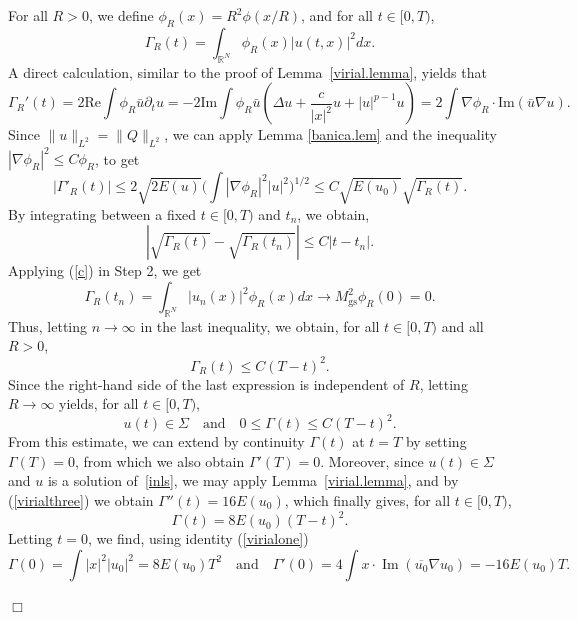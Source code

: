 \documentclass[reqno]{amsart}
\newcommand{\real}{\mathbb{R}}
\newcommand{\rn}{\real^N}
\let\le=\leqslant
\DeclareMathOperator \im{Im}
\theoremstyle{plain}
\theoremstyle{definition}
\numberwithin{equation}{section}
\newenvironment{proofof}
{\medskip\noindent{\it Proof of}}{\nolinebreak\hfill$\Box$\medskip}
\begin{document}
\begin{proofof}
For all $R>0$, we define $\phi_R(x)=R^2\phi(x/R)$, and for all $t\in[0,T)$,
\[
\Gamma_R(t)=\int_{\rn}\phi_R(x)|u(t,x)|^2dx.
\]
A direct calculation, similar to the proof of Lemma~\ref{virial.lemma}, yields that
\[
\Gamma_R'(t)=2\text{Re}\int\phi_R\bar{u}\partial_tu 
=-2\text{Im}\int\phi_R\bar{u}(\Delta u+\frac{c}{|x|^2}u+|u|^{p-1}u)
=2\int\nabla\phi_R\cdot\text{Im}(\bar{u}\nabla u).
\]
Since $\|u\|_{L^2}=\|Q\|_{L^2}$, we can apply Lemma \ref{banica.lem} 
and the inequality $|\nabla\phi_R|^2\le C\phi_R$, to get 
\[
|\Gamma'_R(t)|\le 2\sqrt{2E(u)}\Big(\int|\nabla\phi_R|^2|u|^2\Big)^{1/2}
\le C\sqrt{E(u_0)}\sqrt{\Gamma_R(t)}.
\]
By integrating between a fixed $t\in[0,T)$ and $t_n$, we obtain,
\[
|\sqrt{\Gamma_R(t)}-\sqrt{\Gamma_R(t_n)}|\le C|t-t_n|.
\]
Applying (\ref{c}) in Step 2, we get
\[
\Gamma_R(t_n)=\int_{\rn} |u_n(x)|^2\phi_R(x)dx\rightarrow M_\mathrm{gs}^2\phi_R(0)=0.
\]
Thus, letting $n\to\infty$ in the last inequality, we obtain, for all $t\in [0,T)$ and all $R>0$,
\[
\Gamma_R(t) \le C(T-t)^2.
\]
Since the right-hand side of the last expression is independent of $R$,
letting $R\to\infty$ yields, for all $t\in [0,T)$,
\[
u(t)\in\Sigma \quad\text{and}\quad 0\le \Gamma(t) \le C(T-t)^2.
\]
From this estimate, we can extend by continuity $\Gamma(t)$ at $t=T$ by setting $\Gamma(T)=0$,
from which we also obtain $\Gamma'(T)=0$.
Moreover, since $u(t)\in\Sigma$ and $u$ is a solution of~\eqref{inls}, 
we may apply Lemma~\ref{virial.lemma}, and by (\ref{virialthree}) %
we obtain $\Gamma''(t)=16E(u_0)$, which finally gives, for all $t\in [0,T)$,
\[
\Gamma(t) = 8E(u_0)(T-t)^2.
\]
Letting $t=0$, we find, using identity (\ref{virialone})  %
\[
\Gamma(0)=\int |x|^2|u_0|^2= 8E(u_0)T^2
\quad \text{and}\quad \Gamma'(0)= 4\int x\cdot\im(\overline{u_0}\nabla u_0) = -16E(u_0)T.
\]


\end{proofof}
\end{document}
